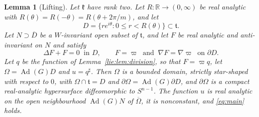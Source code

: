 \documentclass[11pt]{amsart}
\newtheorem{lemma}[theorem]{Lemma}
\theoremstyle{definition}
\theoremstyle{remark}
\numberwithin{equation}{section}
\newcommand{\R}{\mathbb{R}}
\newcommand{\Ad}{\operatorname{Ad}}
\newcommand{\kf}{\mathfrak{k}}
\newcommand{\tf}{\mathfrak{t}}
\begin{document}
\begin{lemma}[Lifting]\label{lie:lem:lift}
Let $\kf$ have rank two. Let $R\colon\R\to(0,\infty)$ be real analytic with $R(\theta)=R(-\theta)=R(\theta+2\pi/m)$, and let
\[
D=\{re^{i\theta}:0\leq r<R(\theta)\}\subset\tf .
\]
Let $N\supset\overline D$ be a $W$-invariant open subset of $\tf$, and let $F$ be real analytic and anti-invariant on $N$ and satisfy
\begin{equation}\label{lie:eq:Pl}
\Delta F+F=0\ \text{ in }D,\qquad F=\varpi\ \text{ and }\ \nabla F=\nabla\varpi\ \text{ on }\partial D .
\end{equation}
Let $q$ be the function of Lemma~\ref{lie:lem:division}, so that $F=\varpi q$, let $\Omega=\Ad(G)D$ and $u=q^\sharp$. Then $\Omega$ is a bounded domain, strictly star-shaped with respect to $0$, with $\Omega\cap\tf=D$ and $\partial\Omega=\Ad(G)\partial D$, and $\partial\Omega$ is a compact real-analytic hypersurface diffeomorphic to $S^{n-1}$. The function $u$ is real analytic on the open neighbourhood $\Ad(G)N$ of $\overline\Omega$, it is nonconstant, and \eqref{eq:main} holds.
\end{lemma}
\end{document}
